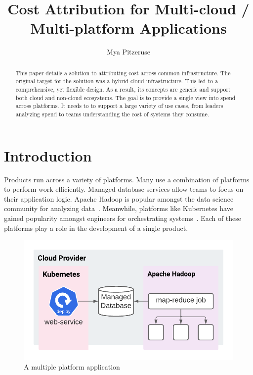 \documentclass[10pt, a4paper, twocolumn]{article}
\title{Cost Attribution for Multi-cloud / Multi-platform Applications}
\author{Mya Pitzeruse}
\begin{document}
\maketitle

\begin{abstract}
  This paper details a solution to attributing cost across common infrastructure.
  The original target for the solution was a hybrid-cloud infrastructure.
  This led to a comprehensive, yet flexible design.
  As a result, its concepts are generic and support both cloud and non-cloud ecosystems.
  The goal is to provide a single view into spend across platforms.
  It needs to to support a large variety of use cases, from leaders analyzing spend to teams understanding the cost of systems they consume.
\end{abstract}


\section*{Introduction}
  Products run across a variety of platforms.
  Many use a combination of platforms to perform work efficiently.
  Managed database services allow teams to focus on their application logic.
  Apache Hadoop is popular amongst the data science community for analyzing data~\cite{hadoop}.
  Meanwhile, platforms like Kubernetes have gained popularity amongst engineers for orchestrating systems~\cite{k8s}.
  Each of these platforms play a role in the development of a single product.

  \begin{figure}[H]
    \centering
    \includegraphics[width=\linewidth]{./cost-attribution-application.png}
    \caption{A multiple platform application}
    \label{figure:1}
  \end{figure}
\end{document}
